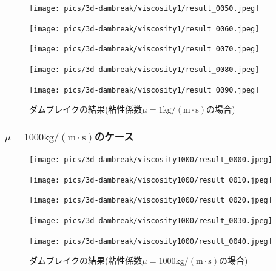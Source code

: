 \begin{figure}[H]
	\centering
	\begin{minipage}[b]{0.19\columnwidth}
	    \centering
	    \texttt{[image: pics/3d-dambreak/viscosity1/result\_0050.jpeg]}
	\end{minipage}
	\begin{minipage}[b]{0.19\columnwidth}
	    \centering
	    \texttt{[image: pics/3d-dambreak/viscosity1/result\_0060.jpeg]}
	\end{minipage}
	\begin{minipage}[b]{0.19\columnwidth}
	    \centering
	    \texttt{[image: pics/3d-dambreak/viscosity1/result\_0070.jpeg]}
	\end{minipage}
	\begin{minipage}[b]{0.19\columnwidth}
	    \centering
	    \texttt{[image: pics/3d-dambreak/viscosity1/result\_0080.jpeg]}
	\end{minipage}
	\begin{minipage}[b]{0.19\columnwidth}
	    \centering
	    \texttt{[image: pics/3d-dambreak/viscosity1/result\_0090.jpeg]}
	\end{minipage}
	\caption{ダムブレイクの結果(粘性係数$\mu = 1 \mathrm{kg/(m\cdot s)}$の場合)}
	\label{fig:dambreak-result-visc1}
\end{figure}


\subsubsection{$\mu = 1000 \mathrm{kg/(m\cdot s)}$のケース}

\begin{figure}[H]
	\centering
	\begin{minipage}[b]{0.19\columnwidth}
	    \centering
	    \texttt{[image: pics/3d-dambreak/viscosity1000/result\_0000.jpeg]}
	\end{minipage}
	\begin{minipage}[b]{0.19\columnwidth}
	    \centering
	    \texttt{[image: pics/3d-dambreak/viscosity1000/result\_0010.jpeg]}
	\end{minipage}
	\begin{minipage}[b]{0.19\columnwidth}
	    \centering
	    \texttt{[image: pics/3d-dambreak/viscosity1000/result\_0020.jpeg]}
	\end{minipage}
	\begin{minipage}[b]{0.19\columnwidth}
	    \centering
	    \texttt{[image: pics/3d-dambreak/viscosity1000/result\_0030.jpeg]}
	\end{minipage}
	\begin{minipage}[b]{0.19\columnwidth}
	    \centering
	    \texttt{[image: pics/3d-dambreak/viscosity1000/result\_0040.jpeg]}
	\end{minipage}
	\caption{ダムブレイクの結果(粘性係数$\mu = 1000 \mathrm{kg/(m\cdot s)}$の場合)}
	\label{fig:dambreak-result-visc1000}
\end{figure}

